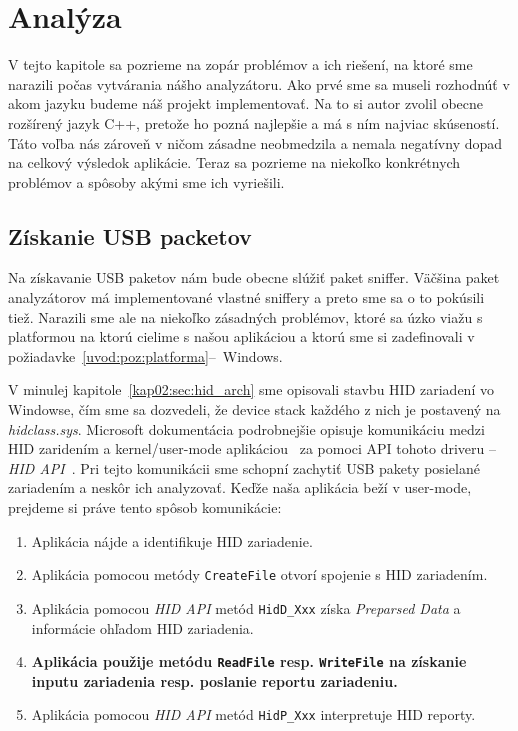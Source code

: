 \chapter{Analýza}
V tejto kapitole sa pozrieme na zopár problémov a ich riešení, na ktoré sme narazili počas vytvárania nášho analyzátoru.
Ako prvé sme sa museli rozhodnúť v akom jazyku budeme náš projekt implementovať. Na to si autor zvolil obecne rozšírený jazyk C++, pretože ho pozná najlepšie a má s ním najviac skúseností. Táto voľba nás zároveň v ničom zásadne neobmedzila a nemala negatívny dopad na celkový výsledok aplikácie. Teraz sa pozrieme na niekoľko konkrétnych problémov a spôsoby akými sme ich vyriešili.

\section{Získanie USB packetov}
Na získavanie USB paketov nám bude obecne slúžiť paket sniffer. Väčšina paket analyzátorov má implementované vlastné sniffery a preto sme sa o to pokúsili tiež. Narazili sme ale na niekoľko zásadných problémov, ktoré sa úzko viažu s platformou na ktorú cielime s našou aplikáciou a ktorú sme si zadefinovali v požiadavke~\ref{uvod:poz:platforma}--~Windows.

V minulej kapitole~\ref{kap02:sec:hid_arch} sme opisovali stavbu HID zariadení vo Windowse, čím sme sa dozvedeli, že device stack každého z nich je postavený na \textit{hidclass.sys}. Microsoft dokumentácia podrobnejšie opisuje komunikáciu medzi HID zaridením a kernel/user-mode aplikáciou~\cite{hid_opening_collections} za pomoci API tohoto driveru -- \textit{HID API}~\cite{hid_api}.
Pri tejto komunikácii sme schopní zachytiť USB pakety posielané zariadením a neskôr ich analyzovať. Keďže naša aplikácia beží v user-mode, prejdeme si práve tento spôsob komunikácie:
\begin{enumerate}
\item Aplikácia nájde a identifikuje HID zariadenie.
\item Aplikácia pomocou metódy \texttt{CreateFile} otvorí spojenie s HID zariadením.
\item Aplikácia pomocou \textit{HID API} metód \texttt{HidD\_Xxx} získa \textit{Preparsed Data} a informácie ohľadom HID zariadenia.
\item \label{kap03:read:paket} \textbf{Aplikácia použije metódu \texttt{ReadFile} resp. \texttt{WriteFile} na získanie inputu zariadenia resp. poslanie reportu zariadeniu.}
\item Aplikácia pomocou \textit{HID API} metód \texttt{HidP\_Xxx} interpretuje HID reporty.
\end{enumerate}

